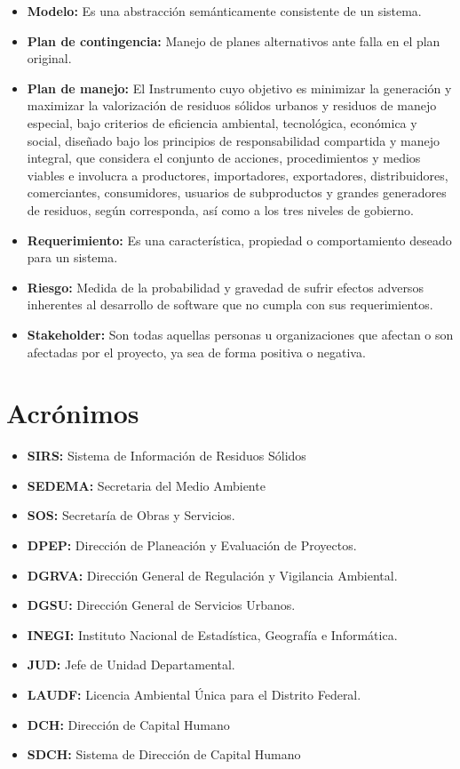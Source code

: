 \begin{itemize}
        \item \textbf{Modelo:} Es una abstracción semánticamente consistente de un sistema.
        \item \textbf{Plan de contingencia:} Manejo de planes alternativos ante falla en el plan original.
        \item \textbf{Plan de manejo:} El Instrumento cuyo objetivo es minimizar la generación y maximizar la valorización de residuos sólidos urbanos y residuos de manejo especial, bajo criterios de eficiencia ambiental, tecnológica, económica y social, diseñado bajo los principios de responsabilidad compartida y manejo integral, que considera el conjunto de acciones, procedimientos y medios viables e involucra a productores, importadores, exportadores, distribuidores, comerciantes, consumidores, usuarios de subproductos y grandes generadores de residuos, según corresponda, así como a los tres niveles de gobierno.
        \item \textbf{Requerimiento:} Es una característica, propiedad o comportamiento deseado para un sistema.
        \item \textbf{Riesgo:} Medida de la probabilidad y gravedad de sufrir efectos adversos inherentes al desarrollo de software que no cumpla con sus requerimientos.
         \item \textbf{Stakeholder:} Son todas aquellas personas u organizaciones que afectan o son afectadas por el proyecto, ya sea de forma positiva o negativa.

    \end{itemize}
    
\section{Acrónimos}
    \begin{itemize} 
    	\item \textbf{SIRS:} Sistema de Información de Residuos Sólidos
     	\item \textbf{SEDEMA:} Secretaria del Medio Ambiente
     	\item \textbf{SOS:} Secretaría de Obras y Servicios.
     	\item \textbf{DPEP: } Dirección de Planeación y Evaluación de Proyectos.
     	\item \textbf{DGRVA:} Dirección General de Regulación y Vigilancia Ambiental.
        \item \textbf{DGSU:} Dirección General de Servicios Urbanos.
        \item \textbf{INEGI:} Instituto Nacional de Estadística, Geografía e Informática.
        \item \textbf{JUD:} Jefe de Unidad Departamental.
        \item \textbf{LAUDF: }Licencia Ambiental Única para el Distrito Federal.
        \item \textbf{DCH: } Dirección de Capital Humano
        \item \textbf{SDCH: } Sistema de Dirección de Capital Humano
    \end{itemize}

